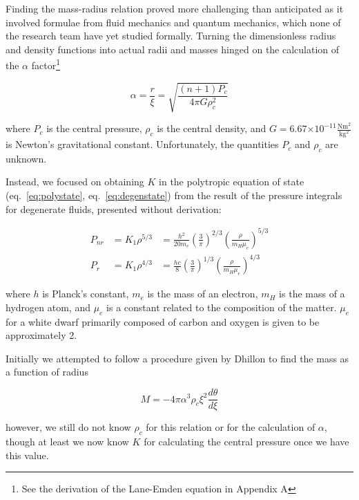 \documentclass[twoside]{article}
\providecommand{\e}[1]{\ensuremath{\times 10^{#1}}} %
\begin{document}
\begin{multicols}{2}
Finding the mass-radius relation proved more challenging than anticipated as it
involved formulae from fluid mechanics and quantum mechanics, which none of the
research team have yet studied formally. Turning the dimensionless radius and
density functions into actual radii and masses hinged on the calculation of the
\(\alpha\) factor\footnote{See the derivation of the Lane-Emden equation in
Appendix A}

\begin{equation}
    \alpha = \frac{r}{\xi} = \sqrt{\frac{(n+1)P_c}{4\pi G\rho_c^2}}
\end{equation}

where \(P_c\) is the central pressure, \(\rho_c\) is the central density, and
\(G=6.67\e{-11}\frac{\mathrm{Nm^2}}{\mathrm{kg^2}}\) is Newton's gravitational
constant. Unfortunately, the quantities \(P_c\) and \(\rho_c\) are unknown.

Instead, we focused on obtaining \(K\) in the polytropic equation of state
(eq.~\ref{eq:polystate}, eq.~\ref{eq:degenstate}) from the result of the
pressure integrals for degenerate fluids, presented without derivation:

\begin{align}
    P_{nr} &= K_1\rho^{5/3} &=
    \frac{h^2}{20m_e}\left(\frac{3}{\pi}\right)^{2/3}\left(\frac{\rho}{m_H\mu_e}\right)^{5/3}
    \label{eq:K1}
    \\
    P_r &= K_1\rho^{4/3} &=
    \frac{hc}{8}\left(\frac{3}{\pi}\right)^{1/3}\left(\frac{\rho}{m_H\mu_e}\right)^{4/3}
    \label{eq:K2}
\end{align}

where \(h\) is Planck's constant, \(m_e\) is the mass of an electron, \(m_H\) is
the mass of a hydrogen atom, and \(\mu_e\) is a constant related to the
composition of the matter. \(\mu_e\) for a white dwarf primarily composed of
carbon and oxygen is given to be approximately 2.

Initially we attempted to follow a procedure given by
Dhillon\cite{website:dhillon} to find the mass as a function of radius

\begin{equation}
    M = -4\pi\alpha^3\rho_c\xi^2\frac{d\theta}{d\xi}
\end{equation}

however, we still do not know \(\rho_c\) for this relation or for the calculation
of \(\alpha\), though at least we now know \(K\) for calculating the central
pressure once we have this value.


\end{multicols}
\end{document}
